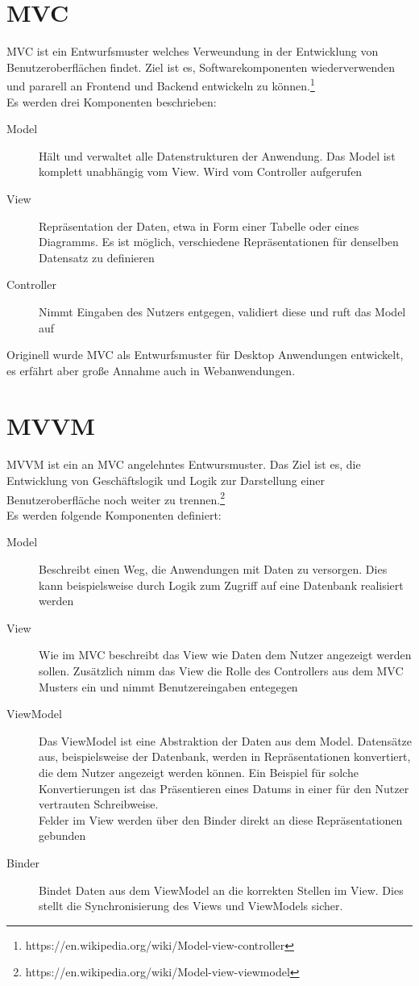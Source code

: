 \section{\acs{MVC}}
\ac{MVC} ist ein Entwurfsmuster welches Verweundung in der Entwicklung von
Benutzeroberflächen findet. Ziel ist es, Softwarekomponenten wiederverwenden und
pararell an Frontend und Backend entwickeln zu können.\footnote{https://en.wikipedia.org/wiki/Model-view-controller}\\
Es werden drei Komponenten beschrieben:
\begin{description}
\item[Model]{Hält und verwaltet alle Datenstrukturen der Anwendung. Das Model ist komplett
  unabhängig vom View. Wird vom Controller aufgerufen}
\item[View]{Repräsentation der Daten, etwa in Form einer Tabelle oder eines Diagramms. Es
    ist möglich, verschiedene Repräsentationen für denselben Datensatz zu definieren}
\item[Controller]{Nimmt Eingaben des Nutzers entgegen, validiert diese und ruft
    das Model auf}
\end{description}
Originell wurde \ac{MVC} als Entwurfsmuster für Desktop Anwendungen entwickelt,
es erfährt aber große Annahme auch in Webanwendungen.
\section{\acs{MVVM}}
\ac{MVVM} ist ein an \ac{MVC} angelehntes Entwursmuster. Das Ziel ist es, die
Entwicklung von Geschäftslogik und Logik zur Darstellung einer
Benutzeroberfläche noch weiter zu trennen.\footnote{https://en.wikipedia.org/wiki/Model-view-viewmodel}\\
Es werden folgende Komponenten definiert:
\begin{description}
\item[Model]{Beschreibt einen Weg, die Anwendungen mit Daten zu versorgen. Dies
    kann beispielsweise durch Logik zum Zugriff auf eine Datenbank realisiert werden}
\item[View]{Wie im \ac{MVC} beschreibt das View wie Daten dem Nutzer angezeigt
    werden sollen. Zusätzlich nimm das View die Rolle des Controllers aus dem
    \ac{MVC} Musters ein und nimmt Benutzereingaben entegegen}
\item[ViewModel]{Das ViewModel ist eine Abstraktion der Daten aus dem Model.
    Datensätze aus, beispielsweise der Datenbank, werden in Repräsentationen
    konvertiert, die dem Nutzer angezeigt werden können. Ein Beispiel für solche
    Konvertierungen ist das Präsentieren eines Datums in einer für den Nutzer
    vertrauten Schreibweise.\\
    Felder im View werden über den Binder direkt an diese Repräsentationen gebunden}
\item[Binder]{Bindet Daten aus dem ViewModel an die korrekten Stellen im View.
    Dies stellt die Synchronisierung des Views und ViewModels sicher.}
\end{description}


